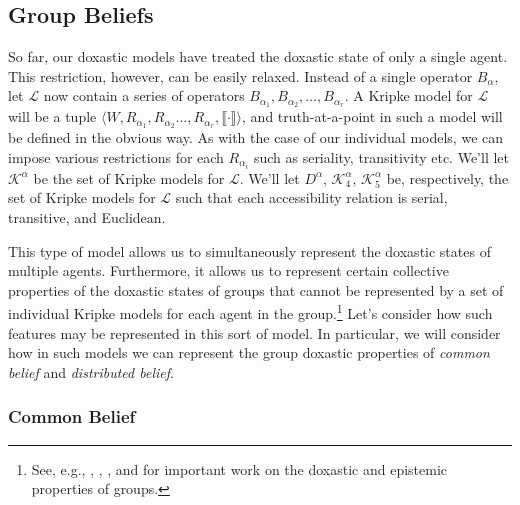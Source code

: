 \subsection{Group Beliefs}\label{caie-section1-2}

So far, our doxastic models have treated the doxastic state of only a single agent. 
This restriction, however, can be easily relaxed.
Instead of a single operator $B_\alpha$, let $\mathcal{L}$ now contain a series of operators $B_{\alpha_1}, B_{\alpha_2},\ldots,B_{\alpha_r}$.
A Kripke model for $\mathcal{L}$ will be a tuple $\langle W, R_{\alpha_1}, R_{\alpha_2}\ldots,R_{\alpha_r}, \llbracket \cdot \rrbracket \rangle$, and truth-at-a-point in such a model will be defined in the obvious way.
As with the case of our individual models, we can impose various restrictions for each $R_{\alpha_i}$ such as seriality, transitivity etc.
We'll let $\mathcal{K}^\alpha$ be the set of Kripke models for $\mathcal{L}$.
We'll let $D^\alpha$, $\mathcal{K}^\alpha_4$, $\mathcal{K}^\alpha_5$ be, respectively, the set of Kripke models for $\mathcal{L}$ such that each accessibility relation is serial, transitive, and Euclidean.


This type of model allows us to simultaneously represent the doxastic states of multiple agents.
Furthermore, it allows us to represent certain collective properties of the doxastic states of groups  that cannot be represented by a set of individual Kripke models for each agent in the group.\footnote{See, e.g., \citet{Fagin}, \citet{Halpern1}, \citet{Halpern2}, and \citet{Halpern3} for important work on the doxastic and epistemic properties of groups.}
Let's consider how such features may be represented in this sort of model.
In particular, we will consider how in such models we can represent the group doxastic properties of \textit{common belief} and \textit{distributed belief}.

\subsubsection{Common Belief}\label{caie-section1-3}

